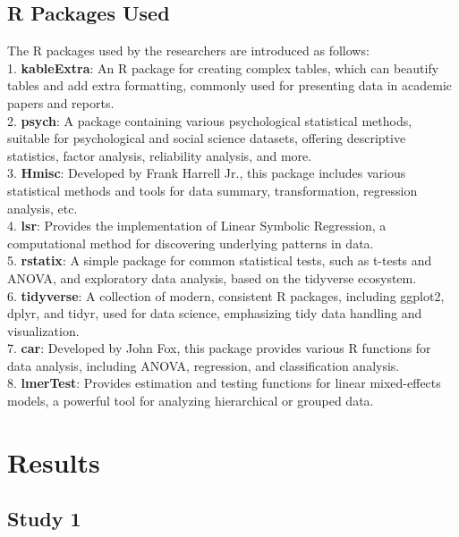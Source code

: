 \documentclass[
  man]{apa6}
\begin{document}
\hypertarget{r-packages-used}{%
\subsection{R Packages Used}\label{r-packages-used}}

The R packages used by the researchers are introduced as follows:\\
1. \textbf{kableExtra}: An R package for creating complex tables, which can beautify tables and add extra formatting, commonly used for presenting data in academic papers and reports.\\
2. \textbf{psych}: A package containing various psychological statistical methods, suitable for psychological and social science datasets, offering descriptive statistics, factor analysis, reliability analysis, and more.\\
3. \textbf{Hmisc}: Developed by Frank Harrell Jr., this package includes various statistical methods and tools for data summary, transformation, regression analysis, etc.\\
4. \textbf{lsr}: Provides the implementation of Linear Symbolic Regression, a computational method for discovering underlying patterns in data.\\
5. \textbf{rstatix}: A simple package for common statistical tests, such as t-tests and ANOVA, and exploratory data analysis, based on the tidyverse ecosystem.\\
6. \textbf{tidyverse}: A collection of modern, consistent R packages, including ggplot2, dplyr, and tidyr, used for data science, emphasizing tidy data handling and visualization.\\
7. \textbf{car}: Developed by John Fox, this package provides various R functions for data analysis, including ANOVA, regression, and classification analysis.\\
8. \textbf{lmerTest}: Provides estimation and testing functions for linear mixed-effects models, a powerful tool for analyzing hierarchical or grouped data.

\hypertarget{results}{%
\section{Results}\label{results}}

\hypertarget{study-1}{%
\subsection{Study 1}\label{study-1}}
\end{document}

